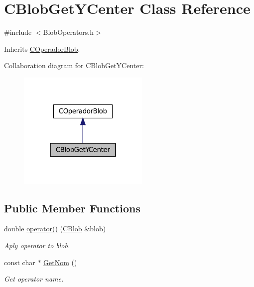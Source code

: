 \hypertarget{class_c_blob_get_y_center}{
\section{CBlobGetYCenter Class Reference}
\label{class_c_blob_get_y_center}
}


{\ttfamily \#include $<$BlobOperators.h$>$}



Inherits \hyperlink{class_c_operador_blob}{COperadorBlob}.



Collaboration diagram for CBlobGetYCenter:
\nopagebreak
\begin{figure}[H]
\begin{center}
\leavevmode
\includegraphics[width=178pt]{class_c_blob_get_y_center__coll__graph}
\end{center}
\end{figure}
\subsection*{Public Member Functions}
\begin{DoxyCompactItemize}
\item 
double \hyperlink{class_c_blob_get_y_center_a5cdb219c957adc1bf08c95e7823e407b}{operator()} (\hyperlink{class_c_blob}{CBlob} \&blob)
\begin{DoxyCompactList}\small\item\em Aply operator to blob. \item\end{DoxyCompactList}\item 
const char $\ast$ \hyperlink{class_c_blob_get_y_center_a20c0a7b0fe20ab1e43aaad7a8462f9e1}{GetNom} ()
\begin{DoxyCompactList}\small\item\em Get operator name. \item\end{DoxyCompactList}\end{DoxyCompactItemize}


